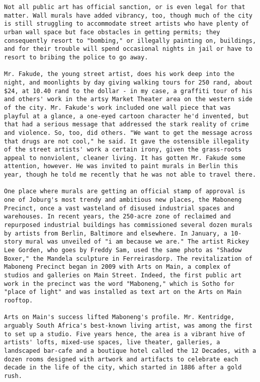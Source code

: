 \begin{lstlisting}
Not all public art has official sanction, or is even legal for that matter. Wall murals have added vibrancy, too, though much of the city is still struggling to accommodate street artists who have plenty of urban wall space but face obstacles in getting permits; they consequently resort to "bombing," or illegally painting on, buildings, and for their trouble will spend occasional nights in jail or have to resort to bribing the police to go away.

Mr. Fakude, the young street artist, does his work deep into the night, and moonlights by day giving walking tours for 250 rand, about $24, at 10.40 rand to the dollar - in my case, a graffiti tour of his and others' work in the artsy Market Theater area on the western side of the city. Mr. Fakude's work included one wall piece that was playful at a glance, a one-eyed cartoon character he'd invented, but that had a serious message that addressed the stark reality of crime and violence. So, too, did others. "We want to get the message across that drugs are not cool," he said. It gave the ostensible illegality of the street artists' work a certain irony, given the grass-roots appeal to nonviolent, cleaner living. It has gotten Mr. Fakude some attention, however. He was invited to paint murals in Berlin this year, though he told me recently that he was not able to travel there.

One place where murals are getting an official stamp of approval is one of Joburg's most trendy and ambitious new places, the Maboneng Precinct, once a vast wasteland of disused industrial spaces and warehouses. In recent years, the 250-acre zone of reclaimed and repurposed industrial buildings has commissioned several dozen murals by artists from Berlin, Baltimore and elsewhere. In January, a 10-story mural was unveiled of "i am because we are." The artist Rickey Lee Gorden, who goes by Freddy Sam, used the same photo as "Shadow Boxer," the Mandela sculpture in Ferreirasdorp. The revitalization of Maboneng Precinct began in 2009 with Arts on Main, a complex of studios and galleries on Main Street. Indeed, the first public art work in the precinct was the word "Maboneng," which is Sotho for "place of light" and was installed as text art on the Arts on Main rooftop.

Arts on Main's success lifted Maboneng's profile. Mr. Kentridge, arguably South Africa's best-known living artist, was among the first to set up a studio. Five years hence, the area is a vibrant hive of artists' lofts, mixed-use spaces, live theater, galleries, a landscaped bar-cafe and a boutique hotel called the 12 Decades, with a dozen rooms designed with artwork and artifacts to celebrate each decade in the life of the city, which started in 1886 after a gold rush.


\end{lstlisting}
